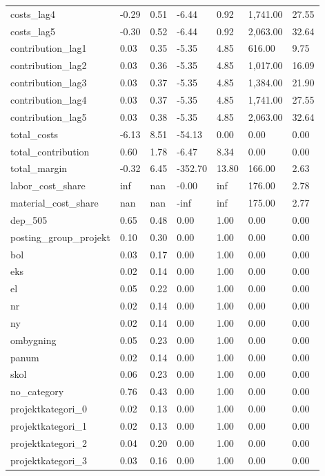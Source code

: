 \begin{landscape}
\begin{longtable}[h!]{lllllll}
costs_lag4 & -0.29 & 0.51 & -6.44 & 0.92 & 1,741.00 & 27.55 \\
costs_lag5 & -0.30 & 0.52 & -6.44 & 0.92 & 2,063.00 & 32.64 \\
contribution_lag1 & 0.03 & 0.35 & -5.35 & 4.85 & 616.00 & 9.75 \\
contribution_lag2 & 0.03 & 0.36 & -5.35 & 4.85 & 1,017.00 & 16.09 \\
contribution_lag3 & 0.03 & 0.37 & -5.35 & 4.85 & 1,384.00 & 21.90 \\
contribution_lag4 & 0.03 & 0.37 & -5.35 & 4.85 & 1,741.00 & 27.55 \\
contribution_lag5 & 0.03 & 0.38 & -5.35 & 4.85 & 2,063.00 & 32.64 \\
total_costs & -6.13 & 8.51 & -54.13 & 0.00 & 0.00 & 0.00 \\
total_contribution & 0.60 & 1.78 & -6.47 & 8.34 & 0.00 & 0.00 \\
total_margin & -0.32 & 6.45 & -352.70 & 13.80 & 166.00 & 2.63 \\
labor_cost_share & inf & nan & -0.00 & inf & 176.00 & 2.78 \\
material_cost_share & nan & nan & -inf & inf & 175.00 & 2.77 \\
dep_505 & 0.65 & 0.48 & 0.00 & 1.00 & 0.00 & 0.00 \\
posting_group_projekt & 0.10 & 0.30 & 0.00 & 1.00 & 0.00 & 0.00 \\
bol & 0.03 & 0.17 & 0.00 & 1.00 & 0.00 & 0.00 \\
eks & 0.02 & 0.14 & 0.00 & 1.00 & 0.00 & 0.00 \\
el & 0.05 & 0.22 & 0.00 & 1.00 & 0.00 & 0.00 \\
nr & 0.02 & 0.14 & 0.00 & 1.00 & 0.00 & 0.00 \\
ny & 0.02 & 0.14 & 0.00 & 1.00 & 0.00 & 0.00 \\
ombygning & 0.05 & 0.23 & 0.00 & 1.00 & 0.00 & 0.00 \\
panum & 0.02 & 0.14 & 0.00 & 1.00 & 0.00 & 0.00 \\
skol & 0.06 & 0.23 & 0.00 & 1.00 & 0.00 & 0.00 \\
no_category & 0.76 & 0.43 & 0.00 & 1.00 & 0.00 & 0.00 \\
projektkategori_0 & 0.02 & 0.13 & 0.00 & 1.00 & 0.00 & 0.00 \\
projektkategori_1 & 0.02 & 0.13 & 0.00 & 1.00 & 0.00 & 0.00 \\
projektkategori_2 & 0.04 & 0.20 & 0.00 & 1.00 & 0.00 & 0.00 \\
projektkategori_3 & 0.03 & 0.16 & 0.00 & 1.00 & 0.00 & 0.00 \\

\end{longtable}
\end{landscape}
